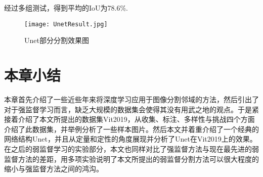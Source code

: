 经过多组测试，得到平均的IoU为78.6\%.

\begin{figure}[htbp]
\begin{center}
\texttt{[image: UnetResult.jpg]}
\end{center}
\vspace{-0.5cm}
\caption{Unet部分分割效果图}
\label{fig:UnetResult}
\end{figure}


\section{本章小结}
本章首先介绍了一些近些年来将深度学习应用于图像分割邻域的方法，然后引出了对于强监督学习而言，缺乏大规模的数据集会使得其没有用武之地的观点。于是紧接着介绍了本文所提出的数据集Vit2019，从收集、标注、多样性与挑战四个方面介绍了此数据集，并举例分析了一些样本图片。然后本文并着重介绍了一个经典的网络结构Unet，并且从定量和定性的角度展现并分析了Unet在Vit2019上的效果。在之后的弱监督学习的实验部分，本文也同样对比了强监督方法与现在最先进的弱监督方法的差距，用多项实验说明了本文所提出的弱监督分割方法可以很大程度的缩小与强监督方法之间的鸿沟。















